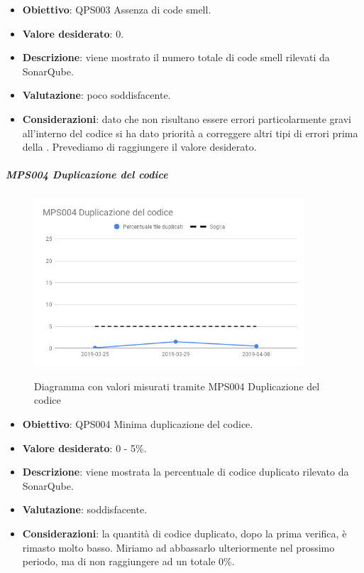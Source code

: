 	\begin{itemize}
		\item \textbf{Obiettivo}: QPS003 Assenza di code smell.
		\item \textbf{Valore desiderato}: 0.
		\item \textbf{Descrizione}: viene mostrato il numero totale di code smell rilevati da SonarQube.
		\item \textbf{Valutazione}: poco soddisfacente.
		\item \textbf{Considerazioni}: dato che non risultano essere errori particolarmente gravi all'interno del codice si ha dato priorità a correggere altri tipi di errori prima della \RQ. Prevediamo di raggiungere il valore
		desiderato.
	\end{itemize}
	
	\subparagraph{MPS004 Duplicazione del codice}
	
	\begin{figure}[H]
		\centering
		\includegraphics[width=0.9\textwidth]{img/cruscotti/RQ/MPS004.png}
		\label{immaginePresenzaDupplicazioneCodiceRQ}
		\caption{Diagramma con valori misurati tramite MPS004 Duplicazione del codice}
	\end{figure}
	
	\begin{itemize}
		\item \textbf{Obiettivo}: QPS004 Minima duplicazione del codice.
		\item \textbf{Valore desiderato}: 0 - 5\%.
		\item \textbf{Descrizione}: viene mostrata la percentuale di codice duplicato rilevato da SonarQube.
		\item \textbf{Valutazione}: soddisfacente.
		\item \textbf{Considerazioni}: la quantità di codice duplicato, dopo la prima verifica, è rimasto molto basso. Miriamo ad abbassarlo ulteriormente nel prossimo periodo, ma di non raggiungere ad un totale 0\%.
	\end{itemize}

